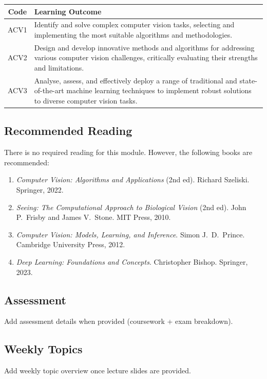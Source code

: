 \begin{center}
\renewcommand{\arraystretch}{1.4}
\begin{tabular}{@{} c p{12cm} @{}}
\toprule
\textbf{Code} & \textbf{Learning Outcome} \\
\midrule
ACV1 & Identify and solve complex computer vision tasks, selecting and implementing the most suitable algorithms and methodologies. \\
ACV2 & Design and develop innovative methods and algorithms for addressing various computer vision challenges, critically evaluating their strengths and limitations. \\
ACV3 & Analyse, assess, and effectively deploy a range of traditional and state-of-the-art machine learning techniques to implement robust solutions to diverse computer vision tasks. \\
\bottomrule
\end{tabular}
\end{center}

\bigseparator

\subsection*{Recommended Reading}

There is no required reading for this module. However, the following books are recommended:

\begin{enumerate}
  \item \textit{Computer Vision: Algorithms and Applications} (2nd ed). Richard Szeliski. Springer, 2022.
  \item \textit{Seeing: The Computational Approach to Biological Vision} (2nd ed). John P.\ Frisby and James V.\ Stone. MIT Press, 2010.
  \item \textit{Computer Vision: Models, Learning, and Inference}. Simon J.\ D.\ Prince. Cambridge University Press, 2012.
  \item \textit{Deep Learning: Foundations and Concepts}. Christopher Bishop. Springer, 2023.
\end{enumerate}

\bigseparator

\subsection*{Assessment}

\TODO{} Add assessment details when provided (coursework + exam breakdown).

\bigseparator

\subsection*{Weekly Topics}

\TODO{} Add weekly topic overview once lecture slides are provided.
